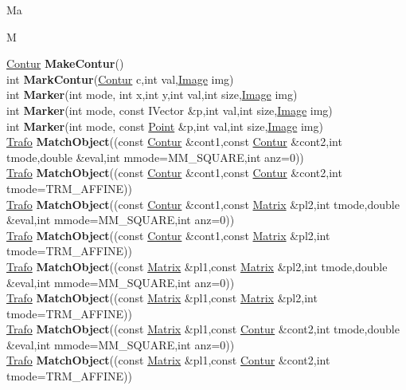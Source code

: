 \documentclass[10pt,titlepage]{article}
\def\functionlistentry#1#2#3#4#5#6{\noindent #1 {\bf #2}(#3) \dotfill #6\\}
\def\letterref#1{}
\def\letterlabel#1{\vspace{0.5cm}\centerline{\Large #1}}
\def\letterlabelend#1{}
\begin{document}
{{\letterlabel{Ma}
\letterlabel{M}
\letterref{A}
\letterref{B}
\letterref{C}
\letterref{D}
\letterref{E}
\letterref{F}
\letterref{G}
\letterref{H}
\letterref{I}
\letterref{K}
\letterref{L}
\letterref{M}
\letterref{N}
\letterref{O}
\letterref{P}
\letterref{Q}
\letterref{R}
\letterref{S}
\letterref{T}
\letterref{U}
\letterref{V}
\letterref{W}
\letterref{X}
\letterref{Y}
\letterref{Z}

\letterref{Ma}
\letterref{Me}
\letterref{Mi}
\letterref{Mk}
\letterref{Mo}
\letterref{Mp}
\letterref{Mu}
\letterlabelend{Ma}
\functionlistentry{\hyperlink{Contur}{Contur}}{MakeContur}{}{604}{geoObject}{}
\functionlistentry{int}{MarkContur}{\hyperlink{Contur}{Contur} c,int val,\hyperlink{Image}{Image} img}{1336}{graphics}{}
\functionlistentry{int}{Marker}{int mode, int x,int y,int val,int size,\hyperlink{Image}{Image} img}{1311}{graphics}{}
\functionlistentry{int}{Marker}{int mode, const IVector \&p,int val,int size,\hyperlink{Image}{Image} img}{1312}{graphics}{}
\functionlistentry{int}{Marker}{int mode, const \hyperlink{Point}{Point} \&p,int val,int size,\hyperlink{Image}{Image} img}{1313}{graphics}{}
\functionlistentry{\hyperlink{Trafo}{Trafo}}{MatchObject}{(const \hyperlink{Contur}{Contur} \&cont1,const \hyperlink{Contur}{Contur} \&cont2,int tmode,double \&eval,int mmode=MM\_SQUARE,int anz=0)}{1266}{registration}{}
\functionlistentry{\hyperlink{Trafo}{Trafo}}{MatchObject}{(const \hyperlink{Contur}{Contur} \&cont1,const \hyperlink{Contur}{Contur} \&cont2,int tmode=TRM\_AFFINE)}{1267}{registration}{}
\functionlistentry{\hyperlink{Trafo}{Trafo}}{MatchObject}{(const \hyperlink{Contur}{Contur} \&cont1,const \hyperlink{Matrix}{Matrix} \&pl2,int tmode,double \&eval,int mmode=MM\_SQUARE,int anz=0)}{1268}{registration}{}
\functionlistentry{\hyperlink{Trafo}{Trafo}}{MatchObject}{(const \hyperlink{Contur}{Contur} \&cont1,const \hyperlink{Matrix}{Matrix} \&pl2,int tmode=TRM\_AFFINE)}{1269}{registration}{}
\functionlistentry{\hyperlink{Trafo}{Trafo}}{MatchObject}{(const \hyperlink{Matrix}{Matrix} \&pl1,const \hyperlink{Matrix}{Matrix} \&pl2,int tmode,double \&eval,int mmode=MM\_SQUARE,int anz=0)}{1270}{registration}{}
\functionlistentry{\hyperlink{Trafo}{Trafo}}{MatchObject}{(const \hyperlink{Matrix}{Matrix} \&pl1,const \hyperlink{Matrix}{Matrix} \&pl2,int tmode=TRM\_AFFINE)}{1271}{registration}{}
\functionlistentry{\hyperlink{Trafo}{Trafo}}{MatchObject}{(const \hyperlink{Matrix}{Matrix} \&pl1,const \hyperlink{Contur}{Contur} \&cont2,int tmode,double \&eval,int mmode=MM\_SQUARE,int anz=0)}{1272}{registration}{}
\functionlistentry{\hyperlink{Trafo}{Trafo}}{MatchObject}{(const \hyperlink{Matrix}{Matrix} \&pl1,const \hyperlink{Contur}{Contur} \&cont2,int tmode=TRM\_AFFINE)}{1273}{registration}{}
}}
\end{document}
